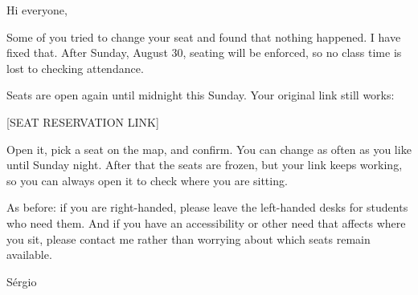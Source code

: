 Hi everyone,

Some of you tried to change your seat and found that nothing happened. I have fixed that. After Sunday, August 30, seating will be enforced, so no class time is lost to checking attendance.

Seats are open again until midnight this Sunday. Your original link still works:

[SEAT RESERVATION LINK]

Open it, pick a seat on the map, and confirm. You can change as often as you like until Sunday night. After that the seats are frozen, but your link keeps working, so you can always open it to check where you are sitting.

As before: if you are right-handed, please leave the left-handed desks for students who need them. And if you have an accessibility or other need that affects where you sit, please contact me rather than worrying about which seats remain available.

Sérgio
